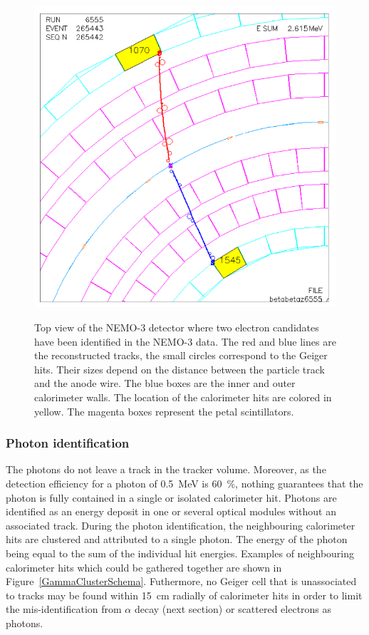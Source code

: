 \documentclass[main.tex]{subfiles}
\begin{document}
\begin{figure}[h!]
\centering
\includegraphics[scale=0.27]{pictures/Chap6/betabetaEvent.png}
\label{DoubleBetaEventDisplay}
\caption{Top view of the NEMO-3 detector where two electron candidates have been identified in the NEMO-3 data. The red and blue lines are the reconstructed tracks, the small circles correspond to the Geiger hits. Their sizes depend on the distance between the particle track and the anode wire. The blue boxes are the inner and outer calorimeter walls. The location of the calorimeter hits are colored in yellow. The magenta boxes represent the petal scintillators.}
\end{figure}

\FloatBarrier

\subsubsection{Photon identification}


\NI The photons do not leave a track in the tracker volume. Moreover, as the detection efficiency for a photon of 0.5~MeV is 60~\%, nothing guarantees that the photon is fully contained in a single or isolated calorimeter hit. Photons are identified as an energy deposit in one or several optical modules without an associated track. During the photon identification, the neighbouring calorimeter hits are clustered and attributed to a single photon. The energy of the photon being equal to the sum of the individual hit energies. Examples of neighbouring calorimeter hits which could be gathered together are shown in Figure~\ref{GammaClusterSchema}. Futhermore, no Geiger cell that is unassociated to tracks may be found within 15~cm radially of calorimeter hits in order to limit the mis-identification from $\alpha$ decay (next section) or scattered electrons as photons.
\end{document}
